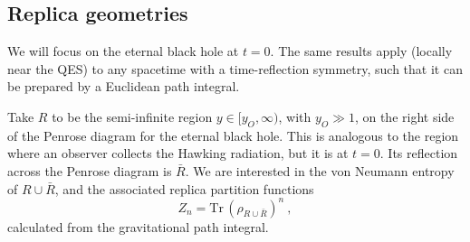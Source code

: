 \documentclass[11pt,oneside,letterpaper]{article}
\newcommand{\be}{\begin{equation}}
\newcommand{\ee}{\end{equation}}
\def\be{\begin{eqnarray}}
\def\ee{\end{eqnarray}}
\newcommand{\tr}{\textrm{Tr}\,}
\def\be{\begin{equation}}
\def\ee{\end{equation}}
\numberwithin{equation}{section}
\def \be {\begin{equation}}
\def \ee {\end{equation}}
\begin{document}
\subsection{Replica geometries}

We will focus on the eternal black hole at $t=0$. The same results apply (locally near the QES) to any spacetime with a time-reflection symmetry, such that it can be prepared by a Euclidean path integral.

Take $R$ to be the semi-infinite region $y \in [y_O, \infty)$, with $y_O \gg 1$, on the right side of the Penrose diagram for the eternal black hole. This is analogous to the region where an observer collects the Hawking radiation, but it is at $t=0$. Its reflection across the Penrose diagram is $\bar{R}$. We are interested in the von Neumann entropy of $R \cup \bar{R}$, and the associated replica partition functions
\be
Z_n = \tr (\rho_{R \cup \bar{R}})^n \ ,
\ee
calculated from the gravitational path integral.
\end{document}
